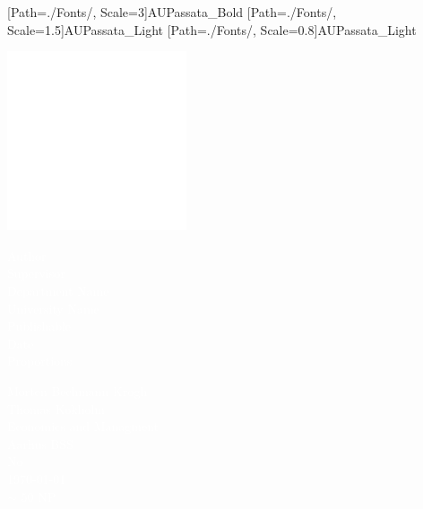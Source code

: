  
\thispagestyle{empty}

\pagecolor{AUdefault}\afterpage{\nopagecolor}
 
\newfontfamily{\AUPB}[Path=./Fonts/, Scale=3]{AUPassata_Bold}
\newfontfamily{\AUPL}[Path=./Fonts/, Scale=1.5]{AUPassata_Light}
\newfontfamily{\AUPLSmall}[Path=./Fonts/, Scale=0.8]{AUPassata_Light}



{\includegraphics[width=200px, left]{Figures/Logos/AarhusBSSlogo_neg_square.eps} }



\vspace{1.5cm}


{\raggedleft{\AUPB \textcolor{white}{
Artificial Neural Network's - Should banks employ ANN for default prediction?}}}%

\vspace{1.5cm}

\begin{minipage}[c]{0.5\textwidth}
\raggedright{\AUPL \textcolor{white}{ 
       Author \\
       Supervisor\\
       Department Name\\
       University Name\\
       Publishable\\
       Date\\
       Proportions
       }}
\end{minipage}%
\begin{minipage}[d]{0.5\textwidth}
\raggedright{\AUPL \textcolor{white}{ 
       Morten Bechmann Krogh\\
       Thomas Kokholm\\
       Economics and Managment\\
       Aarhus BSS\\
       No\\
       \today\\
       $\sim$ 50 NP
       }}
\end{minipage}%

